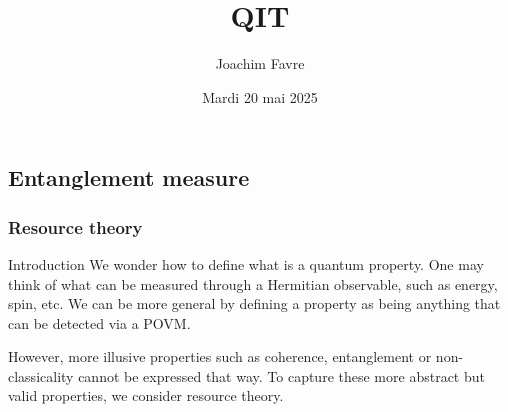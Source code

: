 \documentclass[a4paper]{article}
\title{QIT}
\author{Joachim Favre}
\date{Mardi 20 mai 2025}
\begin{document}
\maketitle


\subsection{Entanglement measure}

\subsubsection{Resource theory}

\begin{parag}{Introduction}
    We wonder how to define what is a quantum property. One may think of what can be measured through a Hermitian observable, such as energy, spin, etc. We can be more general by defining a property as being anything that can be detected via a POVM.

    However, more illusive properties such as coherence, entanglement or non-classicality cannot be expressed that way. To capture these more abstract but valid properties, we consider resource theory.  
\end{parag}
\end{document}
